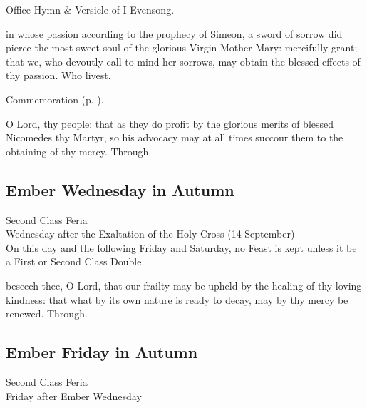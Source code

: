 \secondEvensong
{}

\begin{rubric}
	Office Hymn \& Versicle of I Evensong.
\end{rubric}


\collect
{} in whose passion according to the prophecy of Simeon, a sword of sorrow did pierce the most sweet soul of the glorious Virgin Mother Mary: mercifully grant; that we, who devoutly call to mind her sorrows, may obtain the blessed effects of thy passion. Who livest.
\begin{rubric}
	 Commemoration  (p. \pageref{NicomedesCollect}).
\end{rubric}



\memorialCollect\label{NicomedesCollect}
 O Lord, thy people: that as they do profit by the glorious merits of blessed Nicomedes thy Martyr, so his advocacy may at all times succour them to the obtaining of thy mercy. Through.


\subsection{Ember Wednesday in Autumn}
\begin{inhead}
    {Second Class Feria\\
Wednesday after the Exaltation of the Holy Cross (14 September)\\
On this day and the following Friday and Saturday, no Feast is kept unless it be a First or Second Class Double.}
\end{inhead}


{} beseech thee, O Lord, that our frailty may be upheld by the healing of thy loving kindness: that what by its own nature is ready to decay, may by thy mercy be renewed. Through.


\subsection{Ember Friday in Autumn}
\begin{inhead}
    {Second Class Feria\\
Friday after Ember Wednesday}
\end{inhead}

